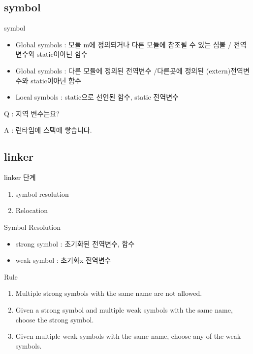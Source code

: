 \documentclass[10pt]{beamer}
\begin{document}
\subsection{symbol}
\begin{frame}{symbol}
    \begin{itemize}
        \item Global symbols : 모듈 m에 정의되거나 다른 모듈에 참조될 수 있는 심볼 / 전역변수와 static이아닌 함수
        \item Global symbols : 다른 모듈에 정의된 전역변수 
        /다른곳에 정의된 (extern)전역변수와 static이아닌 함수
        \item Local symbols : static으로 선언된 함수, static 전역변수
    \end{itemize}
\end{frame}

\begin{frame}
    Q : 지역 변수는요?

    A : 런타임에 스택에 쌓습니다.
\end{frame}


\subsection{linker}
\begin{frame}{linker 단계}
    \begin{enumerate}
        \item symbol resolution
        \item Relocation
    \end{enumerate}
\end{frame}    


\begin{frame}{Symbol Resolution}
    \begin{itemize}
        \item strong symbol : 초기화된 전역변수, 함수
        \item weak symbol : 초기화x 전역변수
    \end{itemize}
    Rule
    \begin{enumerate}
        \item Multiple strong symbols with the same name are not allowed.
        \item Given a strong symbol and multiple weak symbols with the same name, choose the strong symbol.
        \item Given multiple weak symbols with the same name, choose any of the weak symbols.
    \end{enumerate}
\end{frame}    
\end{document}
